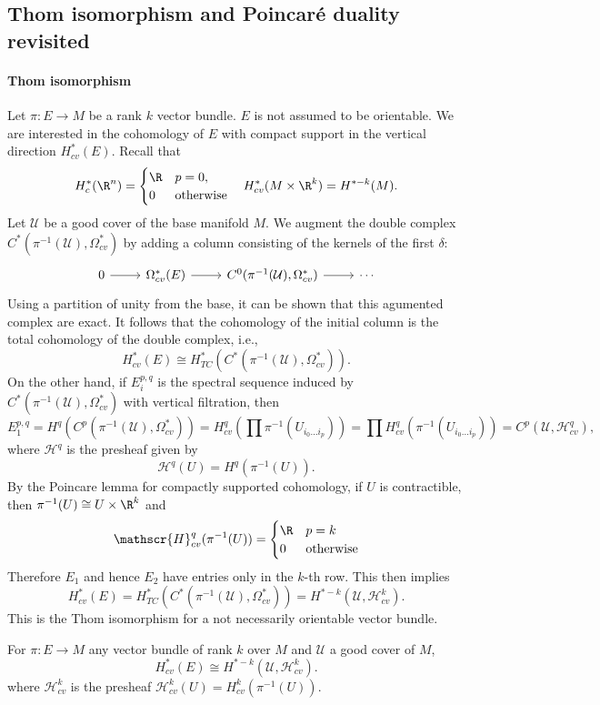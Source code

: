 \subsection{Thom isomorphism and Poincar\'e duality revisited}
\paragraph{Thom isomorphism}
Let $\pi:E\to M$ be a rank $k$ vector bundle. $E$ is not assumed to be orientable. We are interested in the cohomology of $E$ with compact support in the vertical 
direction $H_{cv}^*(E)$. Recall that
\[H^*_{c}(\R^n)=\begin{cases}
\R&p=0,\\
0&\text{otherwise}
\end{cases}\quad H^*_{cv}(M\times\R^k)=H^{*-k}(M).\]
Let $\mathcal{U}$ be a good cover of the base manifold $M$. We augment the double complex $C^*(\pi^{-1}(\mathcal{U}),\Omega^*_{cv})$ by adding a column consisting of 
the kernels of the first $\delta$:
\[\begin{tikzcd}
0\ar[r]&\Omega^*_{cv}(E)\ar[r]&C^0(\pi^{-1}(\mathcal{U}),\Omega^*_{cv})\ar[r]&\cdots
\end{tikzcd}\]
Using a partition of unity from the base, it can be shown that this agumented complex are exact. It follows that the cohomology of the initial column is the total 
cohomology of the double complex, i.e.,
\[H^*_{cv}(E)\cong H_{TC}^*(C^*(\pi^{-1}(\mathcal{U}),\Omega^*_{cv})).\]
On the other hand, if $E_i^{p,q}$ is the spectral sequence induced by $C^*(\pi^{-1}(\mathcal{U}),\Omega^*_{cv})$ with vertical filtration, then
\[E_1^{p,q}=H^q(C^p(\pi^{-1}(\mathcal{U}),\Omega^*_{cv}))=H^q_{cv}(\prod\pi^{-1}(U_{i_0\dots i_p}))=\prod H^q_{cv}(\pi^{-1}(U_{i_0\dots i_p}))=C^p(\mathcal{U},\mathscr{H}^q_{cv}),\]
where $\mathscr{H}^q$ is the presheaf given by
\[\mathscr{H}^q(U)=H^q(\pi^{-1}(U)).\]
By the Poincare lemma for compactly supported cohomology, if $U$ is contractible, then $\pi^{-1}(U)\cong U\times\R^k$ and
\[\mathscr{H}^q_{cv}(\pi^{-1}(U))=\begin{cases}
\R&p=k\\
0&\text{otherwise}
\end{cases}\]
Therefore $E_1$ and hence $E_2$ have entries only in the $k$-th row. This then implies
\[H^*_{cv}(E)=H_{TC}^*(C^*(\pi^{-1}(\mathcal{U}),\Omega^*_{cv}))=H^{*-k}(\mathcal{U},\mathscr{H}^k_{cv}).\]
This is the Thom isomorphism for a not necessarily orientable vector bundle.
\begin{theorem}
For $\pi:E\to M$ any vector bundle of rank $k$ over $M$ and $\mathcal{U}$ a good cover of $M$,
\[H^*_{cv}(E)\cong H^{*-k}(\mathcal{U},\mathscr{H}^k_{cv}).\]
where $\mathscr{H}^k_{cv}$ is the presheaf $\mathscr{H}^k_{cv}(U)=H^k_{cv}(\pi^{-1}(U))$.
\end{theorem}
